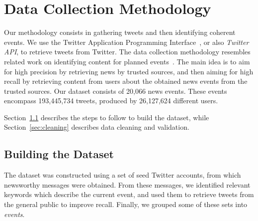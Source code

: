 \chapter{Data Collection Methodology}
\label{chapter:data}  

Our methodology consists in gathering tweets and then identifying coherent
events. 
%
We use the Twitter Application Programming Interface~\cite{twitterapi}, or also
{\em Twitter API}, to retrieve tweets from Twitter. 
%
The data collection methodology resembles related work on identifying content
for planned events~\cite{Becker:2012}.
%
The main idea is to aim for high precision by retrieving news by trusted
sources, and then aiming for high recall by retrieving content from users about
the obtained news events from the trusted sources.
%
Our dataset consists of 20,066 news events. These events encompass 193,445,734
tweets, produced by 26,127,624 different users.


Section~\ref{sec:dataset} describes the steps to follow to build the dataset,
while Section~\ref{sec:cleaning} describes data cleaning and validation.


\section{Building the Dataset}\label{sec:dataset}

The dataset was constructed using a set of seed Twitter accounts, from which
newsworthy messages were obtained.
%
From these messages, we identified relevant keywords which describe the current
event, and used them to retrieve tweets from the general public to improve
recall.
%
Finally, we grouped some of these sets into {\em events}.





